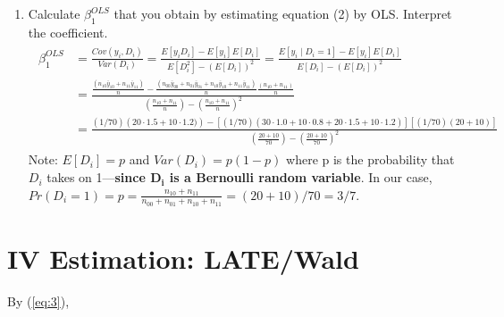 \documentclass[
]{article}
\providecommand{\tightlist}{%
  \setlength{\itemsep}{0pt}\setlength{\parskip}{0pt}}
\begin{document}
\begin{enumerate}
\def\labelenumi{\alph{enumi})}
\setcounter{enumi}{2}
\tightlist
\item
  Calculate \(\beta^{OLS}_1\) that you obtain by estimating equation (2)
  by OLS. Interpret the coefficient. \begin{gather}
  \begin{aligned}
  \beta^{OLS}_1 &= \frac{Cov(y_i, D_i)}{Var(D_i)} = \frac{E\left[y_i D_i\right]-E\left[y_i\right] E\left[D_i\right]}{E[D_i^2]-(E[D_i])^2} = \frac{E\left[y_i\mid D_i=1\right]-E\left[y_i\right] E[D_i]}{E[D_i]-(E[D_i])^2} \\
  & = \frac{\frac{(n_{10}\bar{y}_{10} + n_{11}\bar{y}_{11})}{n} - \frac{(n_{00}\bar{y}_{00} + n_{01}\bar{y}_{01} + n_{10}\bar{y}_{10} + n_{11}\bar{y}_{11})}{n}\frac{(n_{10} + n_{11})}{n}}{(\frac{n_{10} + n_{11}}{n}) - \left(\frac{n_{10} + n_{11}}{n}\right)^2}  \\
  &= \frac{(1/70)\left(20\cdot1.5 + 10\cdot1.2)\right) - \left[(1/70) \left(30\cdot1.0 + 10\cdot0.8 + 20\cdot1.5 + 10\cdot1.2\right)\right]\left[(1/70)(20 + 10)\right]}{(\frac{20 + 10}{70})-(\frac{20 + 10}{70})^2} \label{eq:3}
  \end{aligned}
  \end{gather} Note: \(E[D_i] = p\) and \(Var(D_i) = p(1-p)\) where p is
  the probability that \(D_i\) takes on 1---\textbf{since
  \(\boldsymbol{D_i}\) is a Bernoulli random variable}. In our case,
  \(Pr(D_i=1) = p = \frac{n_{10} + n_{11}}{n_{00} + n_{01} + n_{10} + n_{11}} = (20 + 10) / 70 = 3/7\).
\end{enumerate}

\hypertarget{iv-estimation-latewald}{%
\section{IV Estimation: LATE/Wald}\label{iv-estimation-latewald}}

By (\ref{eq:3}),
\end{document}
